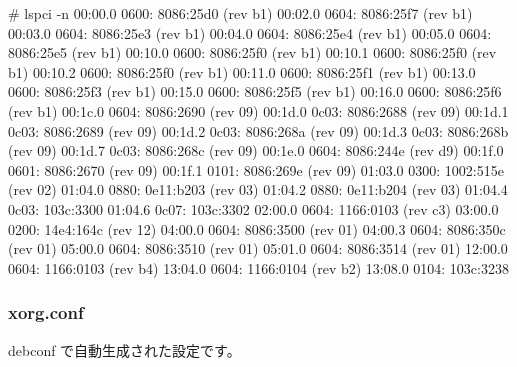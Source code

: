 \documentclass[mingoth,a4paper]{jsarticle}
\begin{document}
\begin{commandline}
# lspci -n 
00:00.0 0600: 8086:25d0 (rev b1)
00:02.0 0604: 8086:25f7 (rev b1)
00:03.0 0604: 8086:25e3 (rev b1)
00:04.0 0604: 8086:25e4 (rev b1)
00:05.0 0604: 8086:25e5 (rev b1)
00:10.0 0600: 8086:25f0 (rev b1)
00:10.1 0600: 8086:25f0 (rev b1)
00:10.2 0600: 8086:25f0 (rev b1)
00:11.0 0600: 8086:25f1 (rev b1)
00:13.0 0600: 8086:25f3 (rev b1)
00:15.0 0600: 8086:25f5 (rev b1)
00:16.0 0600: 8086:25f6 (rev b1)
00:1c.0 0604: 8086:2690 (rev 09)
00:1d.0 0c03: 8086:2688 (rev 09)
00:1d.1 0c03: 8086:2689 (rev 09)
00:1d.2 0c03: 8086:268a (rev 09)
00:1d.3 0c03: 8086:268b (rev 09)
00:1d.7 0c03: 8086:268c (rev 09)
00:1e.0 0604: 8086:244e (rev d9)
00:1f.0 0601: 8086:2670 (rev 09)
00:1f.1 0101: 8086:269e (rev 09)
01:03.0 0300: 1002:515e (rev 02)
01:04.0 0880: 0e11:b203 (rev 03)
01:04.2 0880: 0e11:b204 (rev 03)
01:04.4 0c03: 103c:3300
01:04.6 0c07: 103c:3302
02:00.0 0604: 1166:0103 (rev c3)
03:00.0 0200: 14e4:164c (rev 12)
04:00.0 0604: 8086:3500 (rev 01)
04:00.3 0604: 8086:350c (rev 01)
05:00.0 0604: 8086:3510 (rev 01)
05:01.0 0604: 8086:3514 (rev 01)
12:00.0 0604: 1166:0103 (rev b4)
13:04.0 0604: 1166:0104 (rev b2)
13:08.0 0104: 103c:3238
\end{commandline}

\subsubsection{xorg.conf}

debconf で自動生成された設定です。
\end{document}
